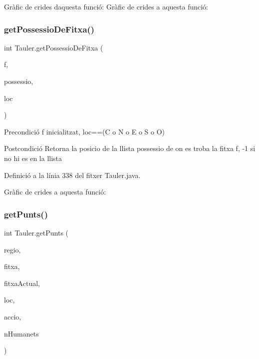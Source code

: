 Gràfic de crides d\textquotesingle{}aquesta funció\+:
Gràfic de crides a aquesta funció\+:
\mbox{\label{class_tauler_aa60647e3555961f2796381dab7c7f2f7}} 
\subsubsection{\texorpdfstring{get\+Possessio\+De\+Fitxa()}{getPossessioDeFitxa()}}
{\footnotesize\ttfamily int Tauler.\+get\+Possessio\+De\+Fitxa (\begin{DoxyParamCaption}\item[{\mbox{\hyperlink{class_fitxa}{Fitxa}}}]{f,  }\item[{Array\+List$<$ \mbox{\hyperlink{class_possessio}{Possessio}} $>$}]{possessio,  }\item[{char}]{loc }\end{DoxyParamCaption})\hspace{0.3cm}{\ttfamily [private]}}

\begin{DoxyPrecond}{Precondició}
f inicialitzat, loc==(\textquotesingle{}C\textquotesingle{} o \textquotesingle{}N\textquotesingle{} o \textquotesingle{}E\textquotesingle{} o \textquotesingle{}S\textquotesingle{} o \textquotesingle{}O\textquotesingle{}) 
\end{DoxyPrecond}
\begin{DoxyPostcond}{Postcondició}
Retorna la posicio de la llista possessio de on es troba la fitxa f, -\/1 si no hi es en la llista 
\end{DoxyPostcond}


Definició a la línia 338 del fitxer Tauler.\+java.

Gràfic de crides a aquesta funció\+:
\mbox{\label{class_tauler_a39fe2ad5d190905b65b8d86440062ce6}} 
\subsubsection{\texorpdfstring{get\+Punts()}{getPunts()}}
{\footnotesize\ttfamily int Tauler.\+get\+Punts (\begin{DoxyParamCaption}\item[{char}]{regio,  }\item[{\mbox{\hyperlink{class_fitxa}{Fitxa}}}]{fitxa,  }\item[{\mbox{\hyperlink{class_fitxa}{Fitxa}}}]{fitxa\+Actual,  }\item[{char}]{loc,  }\item[{String}]{accio,  }\item[{int}]{n\+Humanets }\end{DoxyParamCaption})\hspace{0.3cm}{\ttfamily [private]}}



